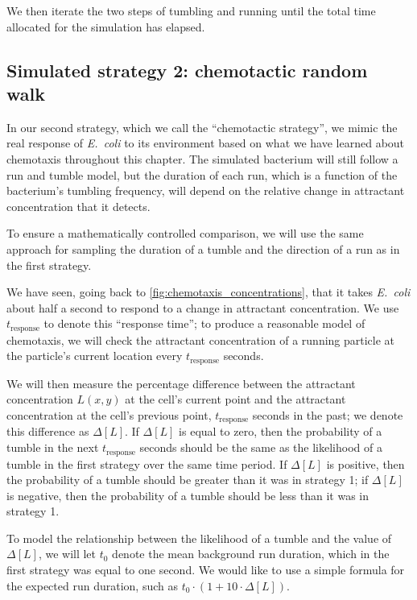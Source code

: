 We then iterate the two steps of tumbling and running until the total time allocated for the simulation has elapsed.

\FloatBarrier
{}
\subsection{Simulated strategy 2: chemotactic random walk}

In our second strategy, which we call the ``chemotactic strategy'', we mimic the real response of \textit{E.~coli} to its environment based on what we have learned about chemotaxis throughout this chapter. The simulated bacterium will still follow a run and tumble model, but the duration of each run, which is a function of the bacterium's tumbling frequency, will depend on the relative change in attractant concentration that it detects.

To ensure a mathematically controlled comparison, we will use the same approach for sampling the duration of a tumble and the direction of a run as in the first strategy.

We have seen, going back to \autoref{fig:chemotaxis_concentrations}, that it takes \textit{E.~coli} about half a second to respond to a change in attractant concentration. We use $t_{\text{response}}$ to denote this ``response time''; to produce a reasonable model of chemotaxis, we will check the attractant concentration of a running particle at the particle's current location every $t_{\text{response}}$ seconds.

We will then measure the percentage difference between the attractant concentration $L(x,y)$ at the cell's current point and the attractant concentration at the cell's previous point, $t_{\text{response}}$ seconds in the past; we denote this difference as $\Delta[L]$. If $\Delta[L]$ is equal to zero, then the probability of a tumble in the next $t_{\text{response}}$ seconds should be the same as the likelihood of a tumble in the first strategy over the same time period. If $\Delta[L]$ is positive, then the probability of a tumble should be greater than it was in strategy 1; if $\Delta[L]$ is negative, then the probability of a tumble should be less than it was in strategy 1.

To model the relationship between the likelihood of a tumble and the value of $\Delta[L]$, we will let $t_0$ denote the mean background run duration, which in the first strategy was equal to one second. We would like to use a simple formula for the expected run duration, such as $t_0 \cdot (1 + 10 \cdot \Delta[L])$.

